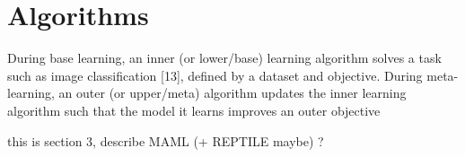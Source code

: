 \section{Algorithms}

During base learning, an inner (or lower/base) learning algorithm solves a task such as image classification [13], defined by a dataset and objective. During meta-learning, an outer (or upper/meta) algorithm updates the inner learning algorithm such that the model it learns improves an outer objective

this is section 3, describe MAML (+ REPTILE maybe) ?
